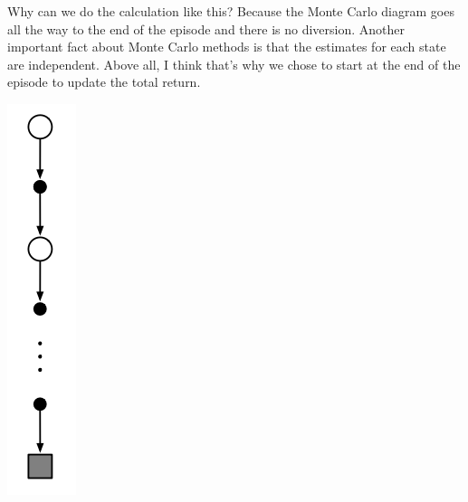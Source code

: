 \documentclass{article}
\begin{document}
\begin{minipage}[c]{0.9\textwidth}
    Why can we do the calculation like this? Because the Monte Carlo diagram goes all the way to the end of the episode and there is no diversion. Another important fact about Monte Carlo methods is that the estimates for each state are independent. Above all, I think that's why we chose to start at the end of the episode to update the total return.
\end{minipage}
\hfill
\begin{minipage}[c]{0.1\textwidth}
    \includegraphics[height = 2.5\textwidth]{Figures/MC_diagram.png}
\end{minipage}
\end{document}
